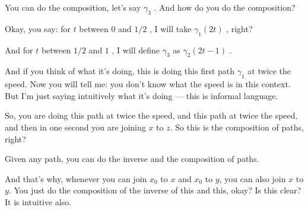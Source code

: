 \begin{proofWrapper}
\begin{speech}[00:58:35 - 01:00:18]
You can do the composition, let's say $\gamma_3$ . And how do you do the composition?

Okay, you say: for $t$ between $0$ and $1/2$ , I will take $\gamma_1(2t)$ , right?

And for $t$ between $1/2$ and $1$ , I will define $\gamma_3$ as $\gamma_2(2t - 1)$ .

And if you think of what it's doing, this is doing this first path $\gamma_1$ at twice the speed. Now you will tell me: you don't know what the speed is in this context. But I'm just saying intuitively what it's doing --- this is informal language.

So, you are doing this path at twice the speed, and this path at twice the speed, and then in one second you are joining $x$ to $z$. So this is the composition of paths, right?

Given any path, you can do the inverse and the composition of paths.

And that's why, whenever you can join $x_0$ to $x$ and $x_0$ to $y$, you can also join $x$ to $y$. You just do the composition of the inverse of this and this, okay? Is this clear? It is intuitive also.
\end{speech}

\begin{hidden}
\end{hidden}

\begin{content}


\end{content}
\end{proofWrapper}
